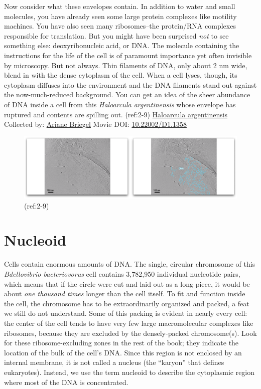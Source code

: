 \documentclass[]{tufte-book}
\begin{document}
Now consider what these envelopes contain. In addition to water and
small molecules, you have already seen some large protein complexes like
motility machines. You have also seen many ribosomes--the protein/RNA
complexes responsible for translation. But you might have been surprised
\emph{not} to see something else: deoxyribonucleic acid, or DNA. The
molecule containing the instructions for the life of the cell is of
paramount importance yet often invisible by microscopy. But not always.
Thin filaments of DNA, only about 2 nm wide, blend in with the dense
cytoplasm of the cell. When a cell lyses, though, its cytoplasm diffuses
into the environment and the DNA filaments stand out against the
now-much-reduced background. You can get an idea of the sheer abundance
of DNA inside a cell from this \emph{Haloarcula argentinensis} whose
envelope has ruptured and contents are spilling out. (ref:2-9)
\protect\hyperlink{tree}{Haloarcula argentinensis} Collected by:
\protect\hyperlink{ariane_briegel}{Ariane Briegel} Movie DOI:
\href{https://doi.org/10.22002/D1.1358}{10.22002/D1.1358}

\begin{figure}
\includegraphics{movie_stills/2_9} \caption[(ref:2-9)]{(ref:2-9)}\label{fig:2-9}
\end{figure}

\section{Nucleoid}\label{nucleoid}

Cells contain enormous amounts of DNA. The single, circular chromosome
of this \emph{Bdellovibrio bacteriovorus} cell contains 3,782,950
individual nucleotide pairs, which means that if the circle were cut and
laid out as a long piece, it would be about \emph{one thousand times}
longer than the cell itself. To fit and function inside the cell, the
chromosome has to be extraordinarily organized and packed, a feat we
still do not understand. Some of this packing is evident in nearly every
cell: the center of the cell tends to have very few large macromolecular
complexes like ribosomes, because they are excluded by the
densely-packed chromosome(s). Look for these ribosome-excluding zones in
the rest of the book; they indicate the location of the bulk of the
cell's DNA. Since this region is not enclosed by an internal membrane,
it is not called a nucleus (the ``karyon'' that defines eukaryotes).
Instead, we use the term nucleoid to describe the cytoplasmic region
where most of the DNA is concentrated.
\end{document}

